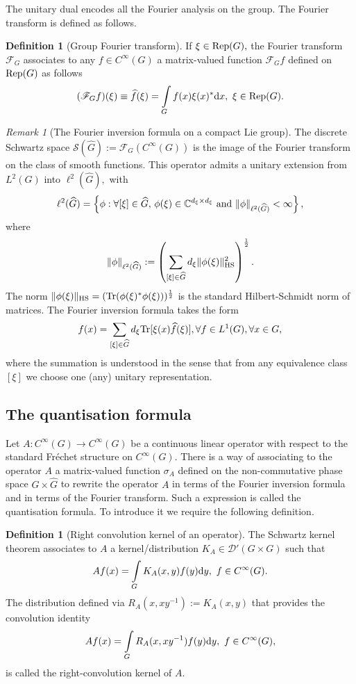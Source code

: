 \documentclass[12pt, reqno]{amsart}
\theoremstyle{definition}
\newtheorem{definition}[theorem]{Definition}
\theoremstyle{remark}
\newtheorem{remark}[theorem]{Remark}
\numberwithin{equation}{section}
\begin{document}
The unitary dual encodes all the Fourier analysis on the group. The Fourier transform is defined as follows.
\begin{definition}[Group Fourier transform]
    If $\xi\in \textnormal{Rep}(G),$ the Fourier transform $\mathscr{F}_{G}$ associates to any $f\in C^\infty(G)$ a matrix-valued function $\mathscr{F}_{G}f$ defined on $\textnormal{Rep}(G)$ as follows
$$ (\mathscr{F}_{G}f)(\xi) \equiv   \widehat{f}(\xi)=\int\limits_Gf(x)\xi(x)^{*}\textnormal{d}x,\,\,\xi\in \textnormal{Rep}(G). $$ 
\end{definition}
\begin{remark}[The Fourier inversion formula on a compact Lie group]
The discrete Schwartz space $\mathscr{S}(\widehat{G}):=\mathscr{F}_{G}(C^\infty(G))$ is the image of the Fourier transform on the class of smooth functions. This operator admits a unitary extension from $L^2(G)$ into $\ell^2(\widehat{G}),$ with 
\begin{equation}
 \ell^2(\widehat{G})=\left\{\phi:\forall [\xi]\in \widehat{G},\,\phi(\xi)\in \mathbb{C}^{d_\xi\times d_\xi}\textnormal{ and }\Vert \phi\Vert_{\ell^2(\widehat{G})}<\infty \right\},  
\end{equation} where
$$  \Vert \phi\Vert_{\ell^2(\widehat{G})}:=\left(\sum_{[\xi]\in \widehat{G}}d_{\xi}\Vert\phi(\xi)\Vert_{\textnormal{HS}}^2\right)^{\frac{1}{2}}. $$
The norm $\Vert\phi(\xi)\Vert_{\textnormal{HS}}=(\textnormal{Tr}(\phi(\xi)^*\phi(\xi)))^{\frac{1}{2}}$ is the standard Hilbert-Schmidt norm of matrices. The Fourier inversion formula takes the form
\begin{equation}
    f(x)=\sum_{[\xi]\in \widehat{G}} d_{\xi}\textnormal{Tr}[\xi(x)\widehat{f}(\xi)],\forall f\in L^1(G), \forall x\in G,
\end{equation}where the summation is understood in the sense that from any equivalence class $[\xi]$ we choose one (any)  unitary representation.      
\end{remark}
 

\subsection{The quantisation formula} Let  $A:C^\infty(G)\rightarrow C^\infty(G)$ be a continuous linear operator with respect to the standard Fr\'echet structure on $C^\infty(G).$ There is a way of associating to the operator $A$ a matrix-valued function $\sigma_A$ defined on the non-commutative phase space $G\times \widehat{G}$ to rewrite the operator $A$ in terms of the Fourier inversion formula and in terms of the Fourier transform. Such a expression is called the quantisation formula. To introduce it we require the following definition.
\begin{definition}[Right convolution kernel of an operator]
 The Schwartz kernel theorem associates to $A$ a kernel/distribution $K_A\in \mathscr{D}'(G\times G)$ such that
$$   Af(x)=\int\limits_{G}K_{A}(x,y)f(y)\textnormal{d}y,\,\,f\in C^\infty(G).$$ The distribution defined via $R_{A}(x,xy^{-1}):=K_A(x,y)$ that provides the convolution identity
$$   Af(x)=\int\limits_{G}R_{A}(x,xy^{-1})f(y)\textnormal{d}y,\,\,f\in C^\infty(G),$$
is called the right-convolution kernel of $A.$   
\end{definition}
\end{document}
